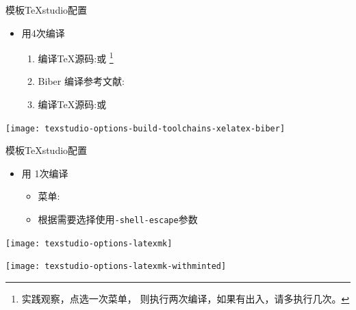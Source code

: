 \documentclass[fontset = adobe, xcolor=svgnames, t, aspectratio=169]{ctexbeamer}
\begin{document}
\begin{frame}{\nwafuthesis 模板}{TeXstudio配置}
  \stretchon
  \begin{itemize}
  \item 用\XeLaTeX \alert{4次}编译
    \begin{enumerate}
    \item \XeLaTeX 编译\TeX 源码:或
      \footnote[frame,1]{实践观察，点选一次菜单，
        则执行两次编译，如果有出入，请多执行几次。}
    \item Biber 编译参考文献:
    \item \XeLaTeX 编译\TeX 源码:或 
    \end{enumerate}
  \end{itemize}
  \centering
  \begin{annotatedFigure}
    {\texttt{[image: texstudio-options-build-toolchains-xelatex-biber]}}
  \end{annotatedFigure}
  \stretchoff
\end{frame}

\begin{frame}{\nwafuthesis 模板}{TeXstudio配置}
  \stretchon
  \begin{itemize}
  \item 用 \alert{1次}编译
    \begin{itemize}
    \item 菜单:
    \item 根据需要选择使用\texttt{-shell-escape}参数
    \end{itemize}
  \end{itemize}
  \centering
  \begin{annotatedFigure}
    {\texttt{[image: texstudio-options-latexmk]}}
  \end{annotatedFigure}
  \begin{annotatedFigure}
    {\texttt{[image: texstudio-options-latexmk-withminted]}}
  \end{annotatedFigure}  
  \stretchoff
\end{frame}
\end{document}
